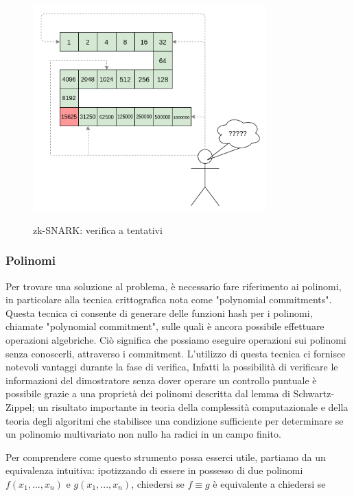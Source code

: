 \begin{figure}[H]
    \centering
    \includegraphics[width=9cm]{./chapters/1.state-of-art/images/6.hope_evaluation.png}
    \label{fig:hope-evaluation}
    \captionsetup{justification=centering}
    \caption{zk-SNARK: verifica a tentativi}
\end{figure}

\subsubsection{Polinomi}

Per trovare una soluzione al problema, è necessario fare riferimento ai polinomi, in particolare alla tecnica
crittografica nota come "polynomial commitments". Questa tecnica ci consente di generare delle funzioni hash per i
polinomi, chiamate "polynomial commitment", sulle quali è ancora possibile effettuare operazioni algebriche. Ciò
significa che possiamo eseguire operazioni sui polinomi senza conoscerli, attraverso i commitment. L'utilizzo di questa
tecnica ci fornisce notevoli vantaggi durante la fase di verifica, Infatti la possibilità di verificare le informazioni
del dimostratore senza dover operare un controllo puntuale è possibile grazie a una proprietà dei polinomi descritta dal
lemma di Schwartz-Zippel; un risultato importante in teoria della complessità
computazionale e della teoria degli algoritmi che stabilisce una condizione sufficiente per determinare se un polinomio
multivariato non nullo ha radici in un campo finito.

Per comprendere come questo strumento possa esserci utile, partiamo da un equivalenza intuitiva: ipotizzando di essere
in possesso di due polinomi $f(x_1,...,x_n)$ e $g(x_1,...,x_n)$, chiedersi se $f \equiv g$ è
equivalente a chiedersi se 

